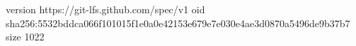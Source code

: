 version https://git-lfs.github.com/spec/v1
oid sha256:5532bddca066f101015f1e0a0e42153e679e7e030e4ae3d0870a5496de9b37b7
size 1022
